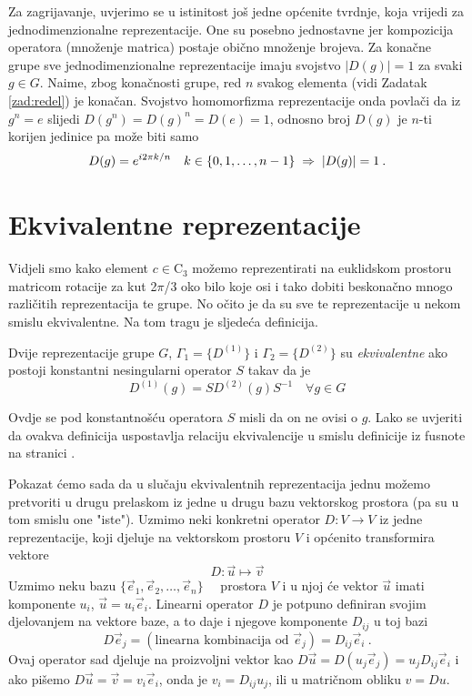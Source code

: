 Za zagrijavanje, uvjerimo se u istinitost još jedne općenite tvrdnje,
koja vrijedi za jednodimenzionalne reprezentacije.
One su posebno jednostavne jer
 kompozicija operatora (množenje matrica) postaje obično množenje
 brojeva.
Za konačne grupe sve jednodimenzionalne reprezentacije imaju svojstvo $|D(g)|=1$
za svaki $g \in G$.
Naime, zbog konačnosti grupe, red $n$ svakog elementa 
(vidi Zadatak \ref{zad:redel}) je konačan. Svojstvo homomorfizma
reprezentacije onda povlači da iz $g^n=e$ slijedi $D(g^n)=
  D(g)^n=D(e)=1$, odnosno broj $D(g)$ je $n$-ti korijen jedinice pa može
  biti samo
\begin{equation*}
 D(g)= e^{i 2\pi k/n} \quad k\in\{0,1,\ldots, n-1\} \;\Rightarrow\; |D(g)|=1 \:.
\end{equation*}

\section{Ekvivalentne reprezentacije}

Vidjeli smo kako element $c \in \mathrm{C}_3$ možemo reprezentirati na
euklidskom prostoru matricom rotacije za kut 2$\pi$/3 oko bilo
koje osi i tako dobiti beskonačno mnogo različitih reprezentacija te
grupe. No očito je da su sve te reprezentacije u nekom smislu
ekvivalentne. Na tom tragu je sljedeća definicija.

\begin{definicija}
Dvije reprezentacije grupe $G$, $\Gamma_{1}=\{D^{(1)}\}$ i $\Gamma_{2}=\{D^{(2)}\}$ su
\emph{ekvivalentne} ako postoji konstantni nesingularni operator
$S$ takav da je
\begin{displaymath}
        D^{(1)}(g) = S D^{(2)}(g) S^{-1} \quad \forall g \in G
\end{displaymath}
\end{definicija}
Ovdje se pod konstantnošću operatora $S$ misli da on ne ovisi o $g$.
Lako se uvjeriti da ovakva definicija uspostavlja relaciju ekvivalencije
u smislu definicije iz fusnote na stranici \pageref{fn:ekviv}.

Pokazat ćemo sada da u slučaju ekvivalentnih reprezentacija jednu
možemo pretvoriti u drugu prelaskom iz jedne u drugu bazu vektorskog
prostora (pa su u tom smislu one "iste"). Uzmimo neki konkretni operator
$D:V \to V$ iz jedne reprezentacije, koji djeluje na vektorskom prostoru
$V$ i općenito transformira vektore
\begin{equation}
D:\vec{u}\mapsto \vec{v}
\end{equation}
Uzmimo neku bazu $\{\vec{e}_1, \vec{e}_2, \ldots, \vec{e}_n\}\quad$ prostora
$V$ i u njoj će vektor $\vec{u}$ imati komponente $u_i$, 
$\vec{u} =  u_i \vec{e}_i$.
Linearni operator $D$ je potpuno definiran svojim djelovanjem na
vektore baze, a to daje i njegove komponente $D_{ij}$ u toj bazi
\begin{equation}
D \vec{e}_j = (\textrm{linearna kombinacija od } \vec{e}_j) = D_{ij}
  \vec{e}_i \:.
\end{equation}
Ovaj operator sad djeluje na proizvoljni vektor kao
  $D\vec{u}=D( u_j \vec{e}_j)= u_j D_{ij} \vec{e}_i$ 
i ako pišemo $D\vec{u}=\vec{v}=v_i \vec{e}_i$, onda je
$v_i = D_{ij} u_j$, ili u matričnom obliku $v=Du$.

